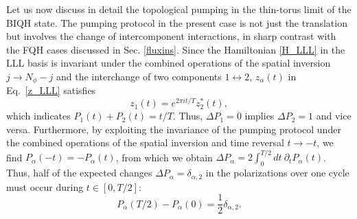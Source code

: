 \documentclass[aps,prb,twocolumn,superscriptaddress,showpacs,floatfix]{revtex4-1}
\begin{document}
Let us now discuss in detail the topological pumping in the thin-torus limit of the BIQH state. 
The pumping protocol in the present case is not just the translation but involves the change of intercomponent interactions, 
in sharp contrast with the FQH cases discussed in Sec. \ref{fluxins}. 
Since the Hamiltonian \eqref{H_LLL} in the LLL basis is invariant under the combined operations of the spatial inversion $j\to N_\phi-j$ and the interchange of two components $1\leftrightarrow 2$, $z_\alpha(t)$ in Eq.\ \eqref{z_LLL} satisfies
\begin{equation}
 z_1(t) = e^{2\pi it/T} z_2^*(t),
\end{equation}
which indicates $P_1(t)+P_2(t)=t/T$. Thus, $\Delta P_1=0$ implies $\Delta P_2=1$ and vice versa. Furthermore, by exploiting 
the invariance of the pumping protocol under the combined operations of the spatial inversion and time reversal $t\to -t$, 
we find $P_\alpha(-t)=-P_\alpha (t)$, from which we obtain $\Delta P_\alpha=2\int_0^{T/2}dt~\partial_tP_\alpha(t)$. 
Thus, half of the expected changes $\Delta P_\alpha=\delta_{\alpha,2}$ in the polarizations over one cycle must occur during $t\in [0,T/2]$: 
\begin{equation}\label{P_half}
P_\alpha(T/2)-P_\alpha(0)=\frac12 \delta_{\alpha,2}. 
\end{equation}
\end{document}
